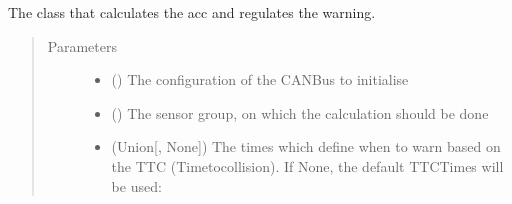\documentclass[letterpaper,10pt,english]{sphinxmanual}
\begin{document}

\begin{fulllineitems}
\label{\detokenize{no_collide:lib.nocollide.NoCollide}}
The class that calculates the acc and regulates the warning.
\begin{quote}\begin{description}
\item[{Parameters}] \leavevmode\begin{itemize}
\item {} 
 () \textendash{} The configuration of the CAN\sphinxhyphen{}Bus to initialise

\item {} 
 ({\hyperref[\detokenize{sensor:lib.sensor.SensorGroup}]{}}) \textendash{} The sensor group, on which the calculation should be done

\item {} 
 (Union{[}{\hyperref[\detokenize{no_collide:lib.nocollide.TtcTimes}]{}}, None{]}) \textendash{} The times which define when to warn based on the TTC (Time\sphinxhyphen{}to\sphinxhyphen{}collision). If None, the default
TTC\sphinxhyphen{}Times will be used: 

\end{itemize}

\end{description}\end{quote}


\end{fulllineitems}
\end{document}
